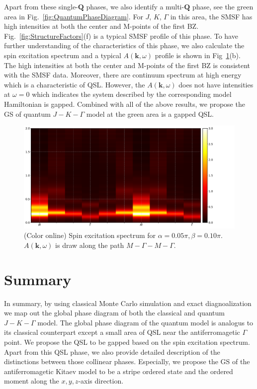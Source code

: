 \documentclass[aps,prb,reprint,amsfonts,amsmath,amssymb,showpacs,groupedaddress,superscriptaddress]{revtex4-1}
\begin{document}
Apart from these single-$\mathbf{Q}$ phases, we also identify a multi-$\mathbf{Q}$ phase, see the green area in Fig.~\ref{fig:QuantumPhaseDiagram}. For $J$, $K$, $\Gamma$ in this area, the SMSF has high intensities at both the center and M-points of the first BZ. Fig.~\ref{fig:StructureFactors}(f) is a typical SMSF profile of this phase. To have further understanding of the characteristics of this phase, we also calculate the spin excitation spectrum and a typical $A(\mathbf{k}, \omega)$ profile is shown in Fig~\ref{fig:Spectrum}(b). The high intensities at both the center and M-points of the first BZ is consistent with the SMSF data. Moreover, there are continuum spectrum at high energy which is a characteristic of QSL. However, the $A(\mathbf{k}, \omega)$ does not have intensities at $\omega = 0$ which indicates the system described by the corresponding model Hamiltonian is gapped. Combined with all of the above results, we propose the GS of quantum $J-K-\Gamma$ model at the green area is a gapped QSL.
\begin{figure}
    \centering
    \includegraphics[width=\columnwidth]{fig/Spectrum.pdf}
    \caption{\label{fig:Spectrum}(Color online) Spin excitation spectrum for $\alpha=0.05\pi,\beta=0.10\pi$. $A(\bm{k}, \omega)$ is draw along the path $M-\Gamma-M-\Gamma$.}
\end{figure}


\section{\label{sec:Summary}Summary}
In summary, by using classical Monte Carlo simulation and exact diagnoalization we map out the global phase diagram of both the classical and quantum $J-K-\Gamma$ model. The global phase diagram of the quantum model is analogus to its classical counterpart except a small area of QSL near the antiferromagetic $\Gamma$ point. We propose the QSL to be gapped based on the spin excitation spectrum. Apart from this QSL phase, we also provide detailed description of the distinctions between those collinear phases. Especially, we propose the GS of the antiferromagetic Kitaev model to be a stripe ordered state and the ordered moment along the $x, y, z$-axis direction.
\end{document}
